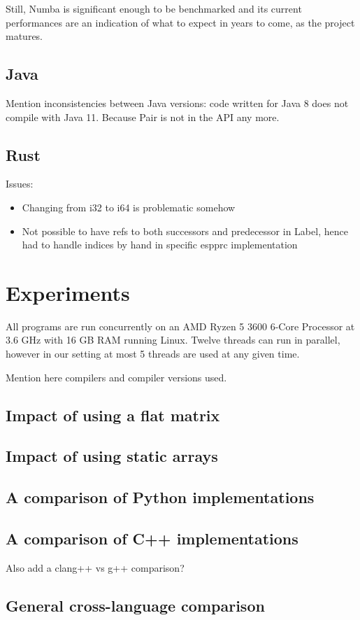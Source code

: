 \documentclass[11pt,a4paper,notitlepage]{article}
\begin{document}
Still, Numba is significant enough to be
benchmarked and its current performances are an indication of what to
expect in years to come, as the project matures.

\subsection{Java}
Mention inconsistencies between Java versions: code written for Java 8
does not compile with Java 11. Because Pair is not in the API any
more.

\subsection{Rust}
Issues:
\begin{itemize}
\item Changing from i32 to i64 is problematic somehow
\item Not possible to have refs to both successors and predecessor in
  Label, hence had to handle indices by hand in specific espprc implementation
\end{itemize}

\section{Experiments}
All programs are run concurrently on an AMD Ryzen 5 3600 6-Core
Processor at 3.6 GHz with 16 GB RAM running Linux. Twelve threads can
run in parallel, however in our setting at most 5 threads are used at
any given time.

Mention here compilers and compiler versions used.

\subsection{Impact of using a flat matrix}
\subsection{Impact of using static arrays}
\subsection{A comparison of Python implementations}
\subsection{A comparison of C++ implementations}
Also add a clang++ vs g++ comparison?
\subsection{General cross-language comparison}
\end{document}
